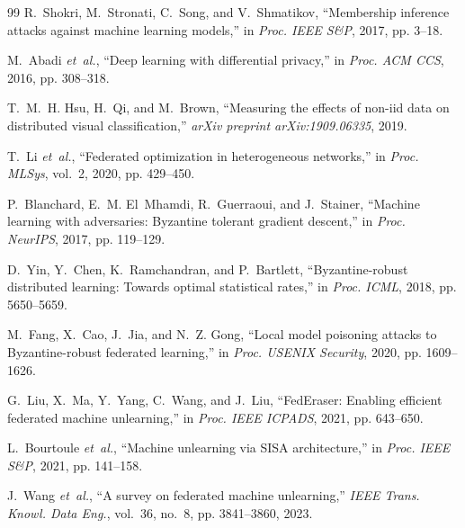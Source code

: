 \documentclass[conference]{IEEEtran}
\begin{document}
\begin{thebibliography}{99}
R.~Shokri, M.~Stronati, C.~Song, and V.~Shmatikov, ``Membership inference attacks against machine learning models,'' in \emph{Proc. IEEE S\&P}, 2017, pp. 3--18.

M.~Abadi \emph{et~al.}, ``Deep learning with differential privacy,'' in \emph{Proc. ACM CCS}, 2016, pp. 308--318.

T.~M.~H. Hsu, H.~Qi, and M.~Brown, ``Measuring the effects of non-iid data on distributed visual classification,'' \emph{arXiv preprint arXiv:1909.06335}, 2019.

T.~Li \emph{et~al.}, ``Federated optimization in heterogeneous networks,'' in \emph{Proc. MLSys}, vol.~2, 2020, pp. 429--450.

P.~Blanchard, E.~M. El~Mhamdi, R.~Guerraoui, and J.~Stainer, ``Machine learning with adversaries: Byzantine tolerant gradient descent,'' in \emph{Proc. NeurIPS}, 2017, pp. 119--129.

D.~Yin, Y.~Chen, K.~Ramchandran, and P.~Bartlett, ``Byzantine-robust distributed learning: Towards optimal statistical rates,'' in \emph{Proc. ICML}, 2018, pp. 5650--5659.

M.~Fang, X.~Cao, J.~Jia, and N.~Z. Gong, ``Local model poisoning attacks to Byzantine-robust federated learning,'' in \emph{Proc. USENIX Security}, 2020, pp. 1609--1626.

G.~Liu, X.~Ma, Y.~Yang, C.~Wang, and J.~Liu, ``FedEraser: Enabling efficient federated machine unlearning,'' in \emph{Proc. IEEE ICPADS}, 2021, pp. 643--650.

L.~Bourtoule \emph{et~al.}, ``Machine unlearning via SISA architecture,'' in \emph{Proc. IEEE S\&P}, 2021, pp. 141--158.

J.~Wang \emph{et~al.}, ``A survey on federated machine unlearning,'' \emph{IEEE Trans. Knowl. Data Eng.}, vol.~36, no.~8, pp. 3841--3860, 2023.

\end{thebibliography}
\end{document}
